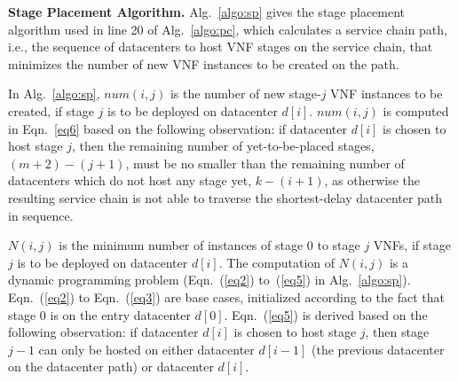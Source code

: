 \noindent\textbf{Stage Placement Algorithm.} Alg.~\ref{algo:sp} gives the stage placement algorithm used in line 20 of Alg.~\ref{algo:pc}, which calculates a service chain path, i.e., the sequence of datacenters to host VNF stages on the service chain, that minimizes the number of new VNF instances to be created on the path. %

In Alg.~\ref{algo:sp}, $num(i, j)$ is the number of new stage-$j$ VNF instances to be created, if stage $j$ is to be deployed on datacenter $d[i]$. $num(i, j)$ is computed in Eqn.~\ref{eq6} based on the following observation: if datacenter $d[i]$ is chosen to host stage $j$, then the remaining number of yet-to-be-placed stages, $(m+2)-(j+1)$, must be no smaller than the remaining number of datacenters which do not host any stage yet, $k-(i+1)$, as otherwise the resulting service chain is not able to traverse the shortest-delay datacenter path in sequence. %

$N(i, j)$ is the minimum number of instances of stage $0$ to stage $j$ VNFs, if stage $j$ is to be deployed on datacenter $d[i]$. The computation of $N(i, j)$ is a dynamic programming problem (Eqn.~(\ref{eq2}) to~(\ref{eq5}) in Alg.~\ref{algo:sp}). Eqn.~(\ref{eq2}) to Eqn.~(\ref{eq3}) are base cases, initialized according to the fact that stage $0$ is on the entry datacenter $d[0]$. Eqn.~(\ref{eq5}) is derived based on the following observation: if datacenter $d[i]$ is chosen to host stage $j$, then stage $j-1$ can only be hosted on either datacenter $d[i-1]$ (the previous datacenter on the datacenter path) or datacenter $d[i]$.




